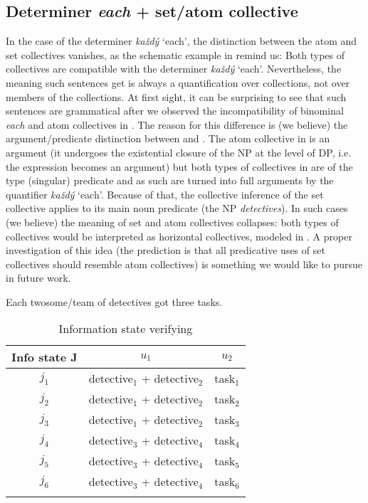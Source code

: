 \documentclass[output=paper,colorlinks,citecolor=brown,newtxmath]{langscibook}
\begin{document}
\z

\subsection{Determiner \textit{each} + set/atom
collective}\label{determiner-each-setatom-collective}

In the case of the determiner \textit{každý} `each', the distinction between the atom and set collectives vanishes, as the schematic example in  remind us: Both types of collectives are compatible with the determiner \textit{každý} `each'. Nevertheless, the meaning such sentences get is always a quantification over collections, not over members of the collections. At first sight, it can be surprising to see that such sentences are grammatical after we observed the incompatibility of binominal \textit{each} and atom collectives in . The reason for this difference is (we believe) the argument/predicate distinction between  and . The atom collective in  is an argument (it undergoes the existential closure of the NP at the level of DP, i.e. the expression becomes an argument) but both types of collectives in  are of the type (singular) predicate and as such are turned into full arguments by the quantifier \textit{každý} `each'. Because of that, the collective inference of the set collective applies to its main noun predicate (the NP \textit{detectives}). In such cases (we believe) the meaning of set and atom collectives collapses: both types of collectives would be interpreted as horizontal collectives, modeled in . A proper investigation of this idea (the prediction is that all predicative uses of set collectives should resemble atom collectives) is something we would like to pursue in future work.

\ea\label{ex:sec-det-each-set-atom-coll} Each twosome/team of detectives got three tasks.
\z

\begin{table}
\centering
\begin{tabularx}{0.6\textwidth}{ccc}
\lsptoprule
Info state J & \(u_1\) & \(u_2\)\tabularnewline
\midrule
\(j_1\) & detective\(_1\) + detective\(_2\) & task\(_1\)\tabularnewline
\(j_2\) & detective\(_1\) + detective\(_2\) & task\(_2\)\tabularnewline
\(j_3\) & detective\(_1\) + detective\(_2\) & task\(_3\)\tabularnewline
\(j_4\) & detective\(_3\) + detective\(_4\) & task\(_4\)\tabularnewline
\(j_5\) & detective\(_3\) + detective\(_4\) & task\(_5\)\tabularnewline
\(j_6\) & detective\(_3\) + detective\(_4\) & task\(_6\)\tabularnewline
\lspbottomrule
\end{tabularx}
\caption{Information state verifying }
\label{table7}
\end{table}
\end{document}
